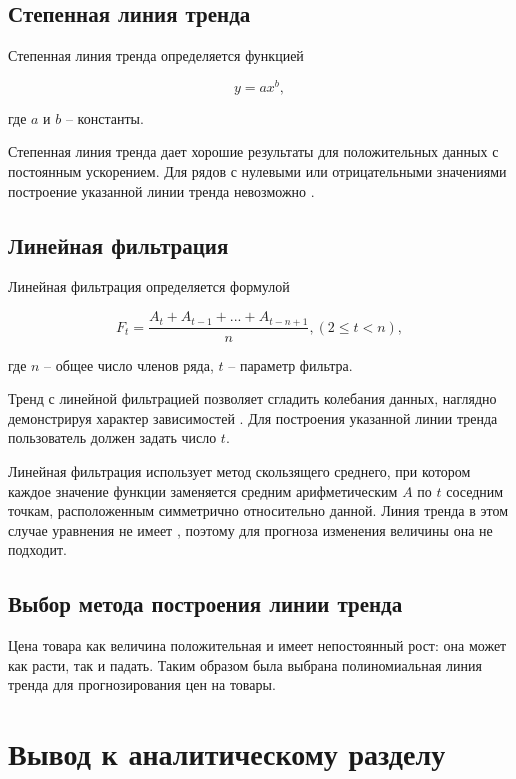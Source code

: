 \documentclass[a4paper,14pt]{extreport}
\begin{document}
\subsection{Степенная линия тренда}

Степенная линия тренда определяется функцией

\begin{equation}
	y = a x ^ b,
\end{equation}

где $a$ и $b$ -- константы.

Степенная линия тренда дает хорошие результаты для положительных данных с постоянным ускорением. Для рядов с нулевыми или отрицательными значениями построение указанной линии трен­да невозможно \cite{lt_exel}.

\subsection{Линейная фильтрация}

Линейная фильтрация определяется формулой

\begin{equation}
	F_t = \frac{A_t + A_{t-1} + ... + A_{t-n+1}}{n}, (2 \leqslant t < n),
\end{equation}

где $n$ -- общее число членов ряда, $t$ -- параметр фильтра.

Тренд с линейной фильтрацией позволяет сгладить колебания данных, наглядно демонстрируя характер зависимостей \cite{lt_exel}. Для построения указанной линии тренда пользователь должен задать число $t$.

Линейная фильтрация использует метод скользящего среднего, при котором каждое значение функции заменяется средним арифметическим $A$ по $t$ соседним точкам, расположенным симметрично относительно данной. Линия тренда в этом случае уравнения не имеет \cite{lin_filt}, поэтому для прогноза изменения величины она не подходит.

\subsection{Выбор метода построения линии тренда}

Цена товара как величина положительная и имеет непостоянный рост: она может как расти, так и падать. Таким образом была выбрана полиномиальная линия тренда для прогнозирования цен на товары.

\section*{Вывод к аналитическому разделу}
\end{document}

